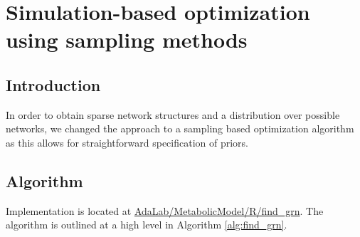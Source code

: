 \chapter{Simulation-based optimization using sampling methods}
\section{Introduction}
In order to obtain sparse network structures and a distribution over possible networks, we changed the approach to a sampling based optimization algorithm as this allows for straightforward specification of priors.
\section{Algorithm}
Implementation is located at \url{AdaLab/MetabolicModel/R/find_grn}. The algorithm is outlined at a high level
in Algorithm \ref{alg:find_grn}.
